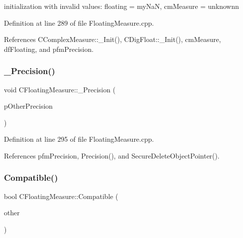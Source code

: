 initialization with invalid values\+: floating = my\+NaN, cm\+Measure = unknownn 



Definition at line 289 of file Floating\+Measure.\+cpp.



References C\+Complex\+Measure\+::\+\_\+\+Init(), C\+Dig\+Float\+::\+\_\+\+Init(), cm\+Measure, df\+Floating, and pfm\+Precision.

\mbox{\label{classCFloatingMeasure_a8e16f55f29d0d4c4148307a1f5953fe3}} 
\subsubsection{\texorpdfstring{\+\_\+\+Precision()}{\_Precision()}}
{\footnotesize\ttfamily void C\+Floating\+Measure\+::\+\_\+\+Precision (\begin{DoxyParamCaption}\item[{const \hyperlink{classCFloatingMeasure}{C\+Floating\+Measure} $\ast$}]{p\+Other\+Precision }\end{DoxyParamCaption})\hspace{0.3cm}{\ttfamily [protected]}}



Definition at line 295 of file Floating\+Measure.\+cpp.



References pfm\+Precision, Precision(), and Secure\+Delete\+Object\+Pointer().

\mbox{\label{classCFloatingMeasure_ae69672971857cf047c5bc7ab4b631b6c}} 
\subsubsection{\texorpdfstring{Compatible()}{Compatible()}\hspace{0.1cm}{\footnotesize\ttfamily [1/2]}}
{\footnotesize\ttfamily bool C\+Floating\+Measure\+::\+Compatible (\begin{DoxyParamCaption}\item[{const \hyperlink{classCFloatingMeasure}{C\+Floating\+Measure} \&}]{other }\end{DoxyParamCaption})\hspace{0.3cm}{\ttfamily [inline]}}



